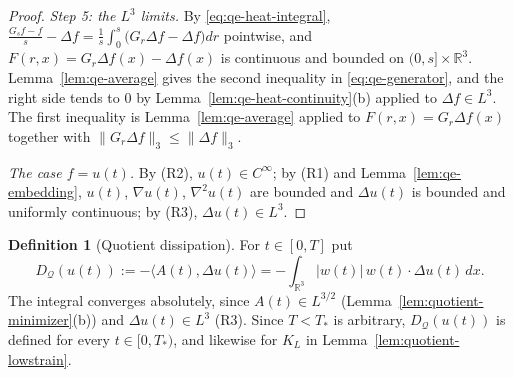 \documentclass[11pt]{article}
\theoremstyle{definition}
\newtheorem{definition}[theorem]{Definition}
\theoremstyle{plain}
\newcommand{\R}{\mathbb R}
\newcommand{\norm}[1]{\lVert #1\rVert}
\begin{document}
\begin{proof}
\emph{Step 5: the $L^3$ limits.}  By \eqref{eq:qe-heat-integral},
$\frac{G_sf-f}s-\Delta f=\frac1s\int_0^s\bigl(G_r\Delta f-\Delta f\bigr)dr$
pointwise, and $F(r,x)=G_r\Delta f(x)-\Delta f(x)$ is continuous and bounded
on $(0,s]\times\R^3$.  Lemma~\ref{lem:qe-average} gives the second
inequality in \eqref{eq:qe-generator}, and the right side tends to $0$ by
Lemma~\ref{lem:qe-heat-continuity}(b) applied to $\Delta f\in L^3$.  The
first inequality is Lemma~\ref{lem:qe-average} applied to
$F(r,x)=G_r\Delta f(x)$ together with $\norm{G_r\Delta f}_3\le\norm{\Delta f}_3$.

\emph{The case $f=u(t)$.}  By (R2), $u(t)\in C^\infty$; by (R1) and
Lemma~\ref{lem:qe-embedding}, $u(t)$, $\nabla u(t)$, $\nabla^2u(t)$ are
bounded and $\Delta u(t)$ is bounded and uniformly continuous; by (R3),
$\Delta u(t)\in L^3$.
\end{proof}

\begin{definition}[Quotient dissipation]\label{def:qe-dissipation}
For $t\in[0,T]$ put
\[
 D_{\mathcal Q}(u(t)):=-\langle A(t),\Delta u(t)\rangle
 =-\int_{\R^3}|w(t)|\,w(t)\cdot\Delta u(t)\,dx .
\]
The integral converges absolutely, since $A(t)\in L^{3/2}$
(Lemma~\ref{lem:quotient-minimizer}(b)) and $\Delta u(t)\in L^3$ (R3).
Since $T<T_*$ is arbitrary, $D_{\mathcal Q}(u(t))$ is defined for
every $t\in[0,T_*)$, and likewise for $K_L$ in
Lemma~\ref{lem:quotient-lowstrain}.
\end{definition}
\end{document}

